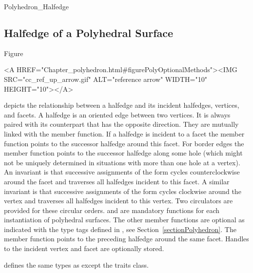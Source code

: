 \begin{ccClass}{Polyhedron_Halfedge}
\subsection{Halfedge of a Polyhedral Surface}

\ccDefinition

Figure~\ccTexHtml{\ref{figurePolyOptionalMethods}}{}\begin{ccHtmlOnly}
  <A HREF="Chapter_polyhedron.html#figurePolyOptionalMethods"><IMG 
  SRC="cc_ref_up_arrow.gif" ALT="reference arrow" WIDTH="10" HEIGHT="10"></A>
\end{ccHtmlOnly}
depicts the relationship between a
halfedge and its incident halfedges, vertices, and facets.  A halfedge
is an oriented edge between two vertices. It is always paired with its
counterpart that has the opposite direction. They are mutually linked
with the  member function. If a halfedge is incident
to a facet the  member function points to the successor
halfedge around this facet. For border edges the  member
function points to the successor halfedge along some hole (which might
not be uniquely determined in situations with more than one hole at a
vertex).  An invariant is that successive assignments of the form
 cycles counterclockwise around the facet and
traverses all halfedges incident to this facet. A similar invariant is
that successive assignments of the form  cycles clockwise around the vertex and
traverses all halfedges incident to this vertex. Two circulators are
provided for these circular orders.  and 
are mandatory functions for each instantiation of polyhedral surfaces.
The other member functions are optional
as indicated with the type tags defined in
, see Section~\ref{sectionPolyhedron}.
The  member function points to the preceding halfedge around
the same facet.  Handles to the incident vertex and facet are
optionally stored.


\ccTypes

 defines the same types as  except
the traits class.



\end{ccClass}
